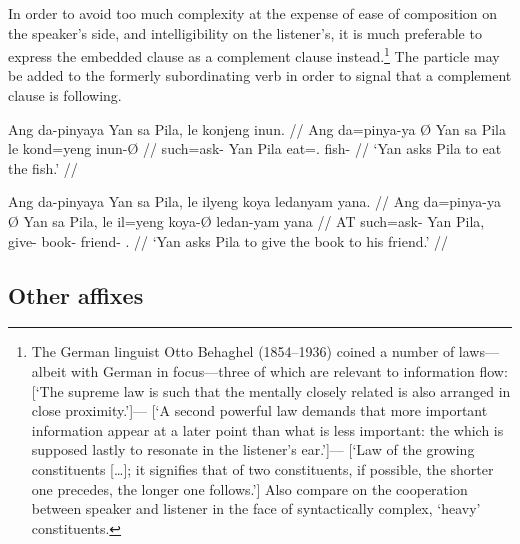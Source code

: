 In order to avoid too much complexity at the expense of ease of composition on 
the speaker's side, and intelligibility on the listener's, it is much 
preferable to express the embedded clause as a complement clause 
instead.\footnote{The German linguist Otto Behaghel (1854--1936) coined a 
number of laws---albeit with German in focus---three of which are relevant to 
information flow:  [`The 
supreme law is such that the mentally closely related is also arranged in close 
proximity.']--- [`A second powerful law demands that more 
important information appear at a later point than what is less important: the 
which is supposed lastly to resonate in the listener's 
ear.']--- [`Law of the growing constituents […]; it signifies that of 
two constituents, if possible, the shorter one precedes, the longer one 
follows.'] Also compare \citet{wasow1997} on the cooperation between speaker 
and listener in the face of syntactically complex, `heavy' constituents.} The 
particle  may be added to the formerly subordinating verb in order 
to signal that a complement clause is following.

\pex
\a\begingl
	\gla Ang da-pinyaya {} Yan sa Pila, \normalfont{[}le konjeng 
		inun\normalfont{]}. //
	\glb Ang da=pinya-ya Ø Yan sa Pila le kond=yeng inun-Ø //
	\glc \AgtT{} such=ask-\TsgM{} \Top{} Yan \Parg{} Pila \PatTI{} 
		eat=\TsgF{}.\Aarg{} fish-\Top{} //
	\glft `Yan asks Pila to eat the fish.' //
\endgl

\a\begingl
	\gla Ang da-pinyaya {} Yan sa Pila, \normalfont{[}le ilyeng koya 
		ledanyam yana\normalfont{]}. //
	\glb Ang da=pinya-ya Ø Yan sa Pila, le il=yeng koya-Ø ledan-yam
		yana //
	\glc AT such=ask-\TsgM{} \Top{} Yan \Parg{} Pila, \PatTI{} give-\TsgF{} 
		book-\Top{} friend-\Dat{} \TsgM{}.\Gen{} //
	\glft `Yan asks Pila to give the book to his friend.' //
\endgl
\xe


\subsection{Other affixes}

